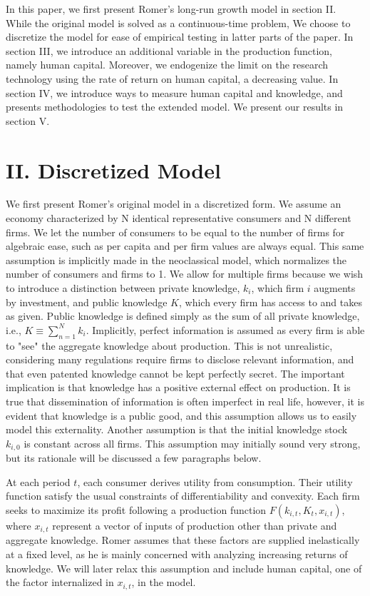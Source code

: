 \documentclass[Journal,letterpaper, NoLineNumbers]{ascelike-new}
\begin{document}
In this paper, we first present Romer's long-run growth model in section II. While the original model is solved as a continuous-time problem, We choose to discretize the model for ease of empirical testing in latter parts of the paper. In section III, we introduce an additional variable in the production function, namely human capital. Moreover, we endogenize the limit on the research technology using the rate of return on human capital, a decreasing value. In section IV, we introduce ways to measure human capital and knowledge, and presents methodologies to test the extended model. We present our results in section V.
 
\section{II. Discretized Model}

We first present Romer's original model in a discretized form. We assume an economy characterized by N identical representative consumers and N different firms. We let the number of consumers to be equal to the number of firms for algebraic ease, such as per capita and per firm values are always equal. This same assumption is implicitly made in the neoclassical model, which normalizes the number of consumers and firms to 1. We allow for multiple firms because we wish to introduce a distinction between private knowledge, $k_i$, which firm $i$ augments by investment, and public knowledge $K$, which every firm has access to and takes as given. Public knowledge is defined simply as the sum of all private knowledge, i.e., $K \equiv \sum\limits_{n=1}^{N} k_i$. Implicitly, perfect information is assumed as every firm is able to "see" the aggregate knowledge about production. This is not unrealistic, considering many regulations require firms to disclose relevant information, and that even patented knowledge cannot be kept perfectly secret. The important implication is that knowledge has a positive external effect on production. It is true that dissemination of information is often imperfect in real life, however, it is evident that knowledge is a public good, and this assumption allows us to easily model this externality. Another assumption is that the initial knowledge stock $k_{i,0}$ is constant across all firms. This assumption may initially sound very strong, but its rationale will be discussed a few paragraphs below. 

At each period $t$, each consumer derives utility from consumption. Their utility function satisfy the usual constraints of differentiability and convexity. Each firm seeks to maximize its profit following a production function $F(k_{i,t},K_t,x_{i,t})$, where $x_{i,t}$ represent a vector of inputs of production other than private and aggregate knowledge. Romer assumes that these factors are supplied inelastically at a fixed level, as he is mainly concerned with analyzing increasing returns of knowledge. We will later relax this assumption and include human capital, one of the factor internalized in $x_{i,t}$, in the model. 
\end{document}
